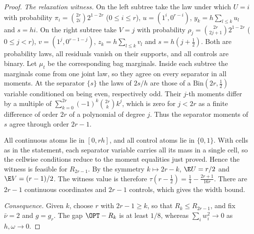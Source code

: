 \begin{proof}
\emph{The relaxation witness.} On the left subtree take the law under which
$U=i$ with probability $\pi_i=\binom{2r}{2i}2^{1-2r}$ ($0\le i\le r$),
$u=(1^i,0^{r-i})$, $y_k=h\sum_{l\le k}u_l$ and $s=hi$. On the right subtree
take $V=j$ with probability $\rho_j=\binom{2r}{2j+1}2^{1-2r}$ ($0\le j<r$),
$v=(1^j,0^{r-1-j})$, $z_k=h\sum_{l\le k}v_l$ and $s=h(j+\frac12)$. Both are
probability laws, all residuals vanish on their supports, and all controls are
binary. Let $\mu_t$ be the corresponding bag marginals. Inside each subtree
the marginals come from one joint law, so they agree on every separator in
all moments. At the separator $\{s\}$ the laws of $2s/h$ are those of a
$\mathrm{Bin}(2r,\frac12)$ variable conditioned on being even, respectively
odd. Their $j$-th moments differ by a multiple of
$\sum_{k=0}^{2r}(-1)^k\binom{2r}kk^j$, which is zero for $j<2r$ as a finite
difference of order $2r$ of a polynomial of degree $j$. Thus the separator
moments of $s$ agree through order $2r-1$.

All continuous atoms lie in $[0,rh]$, and all control atoms lie in
$\{0,1\}$. With cells as in the statement, each separator variable carries
all its mass in a single cell, so the cellwise conditions reduce to the
moment equalities just proved. Hence the witness is feasible for $R_{2r-1}$.
By the symmetry $k\mapsto2r-k$, $\E U=r/2$ and $\E V=(r-1)/2$. The witness
value is therefore $\tau(r-\frac12)=\frac14-\frac{2r+1}{16r}$. There are
$2r-1$ continuous coordinates and $2r-1$ controls, which gives the width
bound.

\emph{Consequence.} Given $k$, choose $r$ with $2r-1\ge k$, so that
$R_k\le R_{2r-1}$, and fix $\bar\nu=2$ and $g=g_r$. The gap $\OPT-R_k$ is at
least $1/8$, whereas $\sum_iw_i^2\to0$ as $h,\omega\to0$.
\end{proof}

